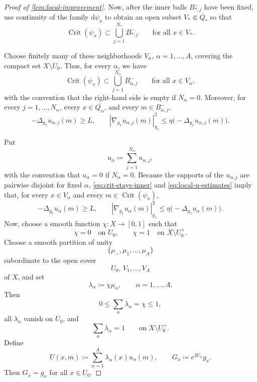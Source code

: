 \documentclass[11pt]{amsart}
\numberwithin{equation}{section}
\DeclareMathOperator{\Crit}{Crit}
\let\geq\geqslant
\let\leq\leqslant
\begin{document}
\begin{proof}[Proof of \cref{lem:local-improvement}]
Now, after the inner balls \(B_{*,j}^-\) have been fixed, use continuity of the family
\(\mathrm d\psi_x\) to obtain an open subset \(V_*\Subset Q_*\) so that
\[
 \Crit(\psi_x)\subset \bigcup_{j=1}^{N_*}B_{*,j}^-
 \qquad
 \text{for all }x\in V_*.
\]

Choose finitely many of these neighborhoods \(V_\alpha\), \(\alpha=1,\ldots,A\), covering the compact
set \(X\setminus U_0\). 
Thus, for every \(\alpha\), we have
\begin{equation}\label{eq:crit-stays-inner}
 \Crit(\psi_x)\subset\bigcup_{j=1}^{N_\alpha}B_{\alpha,j}^-
 \qquad
 \text{for all }x\in V_\alpha,
\end{equation}
with the convention that the right-hand side is empty if \(N_\alpha=0\). Moreover, for every
\(j=1,\ldots,N_\alpha\), every \(x\in\overline{Q_\alpha}\), and every \(m\in B_{\alpha,j}^-\),
\begin{equation}\label{eq:local-u-estimates}
 -\Delta_{g_x}u_{\alpha,j}(m)\geq L,
 \qquad
 |\nabla_{g_x}u_{\alpha,j}(m)|_{g_x}^2
 \leq
 \eta\bigl(-\Delta_{g_x}u_{\alpha,j}(m)\bigr).
\end{equation}

Put
\[
 u_\alpha\coloneqq \sum_{j=1}^{N_\alpha}u_{\alpha,j},
\]
with the convention that \(u_\alpha=0\) if \(N_\alpha=0\). Because the supports of the
\(u_{\alpha,j}\) are pairwise disjoint for fixed \(\alpha\), \eqref{eq:crit-stays-inner} and
\eqref{eq:local-u-estimates} imply that, for every \(x\in V_\alpha\) and every
\(m\in\Crit(\psi_x)\),
\begin{equation}\label{eq:u-alpha-estimates}
 -\Delta_{g_x}u_\alpha(m)\geq L,
 \qquad
 |\nabla_{g_x}u_\alpha(m)|_{g_x}^2
 \leq
 \eta\bigl(-\Delta_{g_x}u_\alpha(m)\bigr).
\end{equation}
Now, choose a smooth function \(\chi:X\to[0,1]\) such that
\[
 \chi=0 \quad\text{on } U_0,
 \qquad
 \chi=1 \quad\text{on } X\setminus U_0^+.
\]
Choose a smooth partition of unity
\[
 \{\mu_-,\mu_1,\ldots,\mu_A\}
\]
subordinate to the open cover
\[
 U_0,\,V_1,\ldots,V_A
\]
of \(X\), and set
\[
 \lambda_\alpha\coloneqq \chi\mu_\alpha,
 \qquad \alpha=1,\ldots,A.
\]
Then
\[
 0\leq\sum_\alpha\lambda_\alpha=\chi\leq1,
\]
all \(\lambda_\alpha\) vanish on \(U_0\), and
\[
 \sum_\alpha\lambda_\alpha=1
 \qquad
 \text{on } X\setminus U_0^+ .
\]
Define
\[
 U(x,m)\coloneqq \sum_{\alpha=1}^A\lambda_\alpha(x)u_\alpha(m),
 \qquad
 G_x\coloneqq e^{2U_x}g_x.
\]
Then \(G_x=g_x\) for all \(x\in U_0\).


\end{proof}
\end{document}
